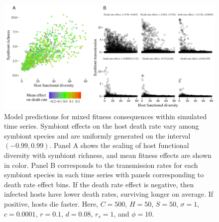 \documentclass[12pt]{article}
\begin{document}
\newpage

\begin{figure}[ht]\centering
\includegraphics[width=\textwidth,height=\dimexpr\textheight-4\baselineskip-\abovecaptionskip-\belowcaptionskip\relax,
keepaspectratio]{fig/fig5.pdf}
\caption{Model predictions for mixed fitness consequences within simulated time series. Symbiont effects on the host death rate vary among symbiont species and are uniformly generated on the interval $(-0.99, 0.99)$. Panel A shows the scaling of host functional diversity with symbiont richness, and mean fitness effects are shown in color. Panel B corresponds to the transmission rates for each symbiont species in each time series with panels corresponding to death rate effect bins. If the death rate effect is negative, then infected hosts have lower death rates, surviving longer on average. If positive, hosts die faster. Here, $C=500$, $H=50$, $S=50$, $\sigma = 1$, $c=0.0001$, $r=0.1$, $d=0.08$, $r_s=1$, and $\phi = 10$.}
\label{f6}
\end{figure}

\newpage
\end{document}
